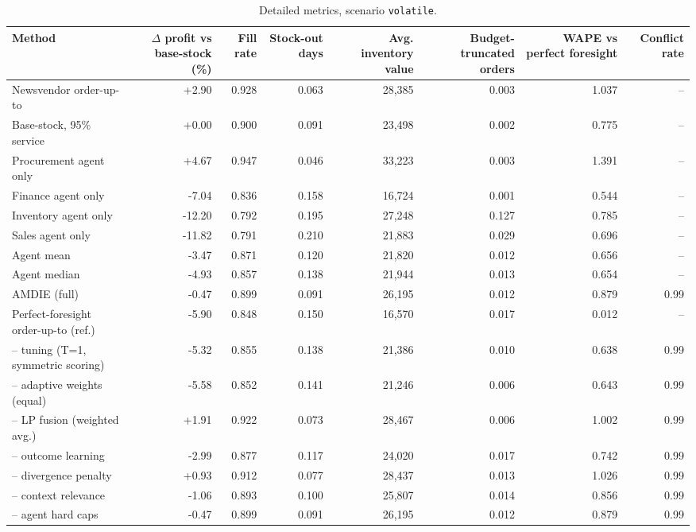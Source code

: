 \begin{table}[t]
\centering\small
\caption{Detailed metrics, scenario \texttt{volatile}.}\label{tab:detail-volatile}
\begin{tabular}{lrrrrrrr}
\toprule
Method & $\Delta$ profit vs base-stock (\%) & Fill rate & Stock-out days & Avg. inventory value & Budget-truncated orders & WAPE vs perfect foresight & Conflict rate \\
\midrule
Newsvendor order-up-to & +2.90 & 0.928 & 0.063 & 28,385 & 0.003 & 1.037 & -- \\
Base-stock, 95\% service & +0.00 & 0.900 & 0.091 & 23,498 & 0.002 & 0.775 & -- \\
Procurement agent only & +4.67 & 0.947 & 0.046 & 33,223 & 0.003 & 1.391 & -- \\
Finance agent only & -7.04 & 0.836 & 0.158 & 16,724 & 0.001 & 0.544 & -- \\
Inventory agent only & -12.20 & 0.792 & 0.195 & 27,248 & 0.127 & 0.785 & -- \\
Sales agent only & -11.82 & 0.791 & 0.210 & 21,883 & 0.029 & 0.696 & -- \\
Agent mean & -3.47 & 0.871 & 0.120 & 21,820 & 0.012 & 0.656 & -- \\
Agent median & -4.93 & 0.857 & 0.138 & 21,944 & 0.013 & 0.654 & -- \\
AMDIE (full) & -0.47 & 0.899 & 0.091 & 26,195 & 0.012 & 0.879 & 0.99 \\
Perfect-foresight order-up-to (ref.) & -5.90 & 0.848 & 0.150 & 16,570 & 0.017 & 0.012 & -- \\
-- tuning (T=1, symmetric scoring) & -5.32 & 0.855 & 0.138 & 21,386 & 0.010 & 0.638 & 0.99 \\
-- adaptive weights (equal) & -5.58 & 0.852 & 0.141 & 21,246 & 0.006 & 0.643 & 0.99 \\
-- LP fusion (weighted avg.) & +1.91 & 0.922 & 0.073 & 28,467 & 0.006 & 1.002 & 0.99 \\
-- outcome learning & -2.99 & 0.877 & 0.117 & 24,020 & 0.017 & 0.742 & 0.99 \\
-- divergence penalty & +0.93 & 0.912 & 0.077 & 28,437 & 0.013 & 1.026 & 0.99 \\
-- context relevance & -1.06 & 0.893 & 0.100 & 25,807 & 0.014 & 0.856 & 0.99 \\
-- agent hard caps & -0.47 & 0.899 & 0.091 & 26,195 & 0.012 & 0.879 & 0.99 \\
\bottomrule
\end{tabular}
\end{table}


